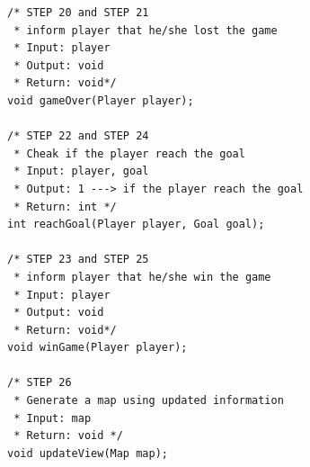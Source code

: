 \begin{lstlisting}[frame=single]
/* STEP 20 and STEP 21
 * inform player that he/she lost the game
 * Input: player
 * Output: void
 * Return: void*/
void gameOver(Player player);

/* STEP 22 and STEP 24
 * Cheak if the player reach the goal
 * Input: player, goal
 * Output: 1 ---> if the player reach the goal
 * Return: int */
int reachGoal(Player player, Goal goal);

/* STEP 23 and STEP 25
 * inform player that he/she win the game
 * Input: player
 * Output: void
 * Return: void*/
void winGame(Player player);

/* STEP 26
 * Generate a map using updated information
 * Input: map
 * Return: void */
void updateView(Map map);


\end{lstlisting}


